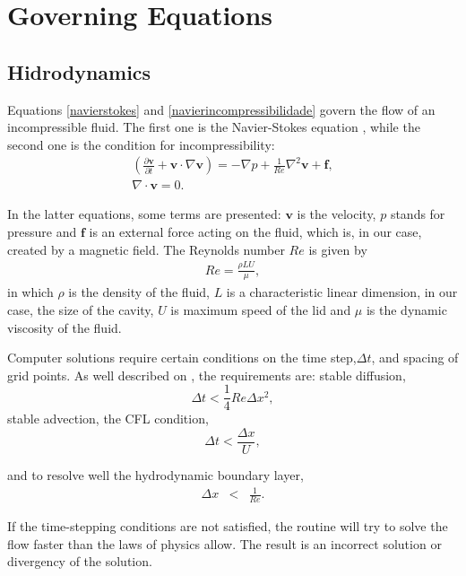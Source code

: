 \documentclass[journal]{IEEEtran}
\begin{document}
\section{Governing Equations}
\subsection{Hidrodynamics}
Equations \ref{navierstokes} and \ref{navierincompressibilidade} govern the flow of an incompressible fluid. The first one is the Navier-Stokes equation \cite{batchelor}, while the second one is the condition for incompressibility: \begin{eqnarray}
\left( \frac{\partial {\textbf{v}}}{\partial t}+\textbf{v}\cdot\nabla \textbf{v} \right)=-\nabla p+\frac{1}{\mathit{Re}}\nabla^2 \textbf{v} + \textbf{f}\label{navierstokes},\\
\nabla\cdot\textbf{v}=0.\label{navierincompressibilidade}
\end{eqnarray}

In the latter equations, some terms are presented: $\mathbf{v}$ is the velocity, $p$ stands for pressure and $\mathbf{f}$ is an external force acting on the fluid, which is, in our case, created by a magnetic field. The Reynolds number $\mathit{Re}$ is given by \begin{eqnarray}
\mathit{Re}=\frac{\rho L U}{\mu},
\end{eqnarray} in which $\rho$ is the density of the fluid, $L$ is a characteristic linear dimension, in our case, the size of the cavity, $U$ is maximum speed of the lid and $\mu$ is the dynamic viscosity of the fluid.

Computer solutions require certain conditions on the time step,$\Delta t$, and spacing of grid points. As well described on \cite{hinchLectureNotes}, the requirements are: stable diffusion, 
\begin{equation}
\Delta t < \frac{1}{4}\mathit{Re}\Delta x^2, \label{stablediffusion}
\end{equation} stable advection, the CFL condition,
\begin{equation}
\Delta t < \frac{\Delta x}{U}, \label{stableadvection}
\end{equation}

 and to resolve well the hydrodynamic boundary layer,  
 \begin{eqnarray}
\Delta x &<& \frac{1}{\mathit{Re}}. \label{boundarylayer}
\end{eqnarray} 

If the time-stepping conditions are not satisfied, the routine will try to solve the flow faster than the laws of physics allow. The result is an incorrect solution or divergency of the solution.
\end{document}
